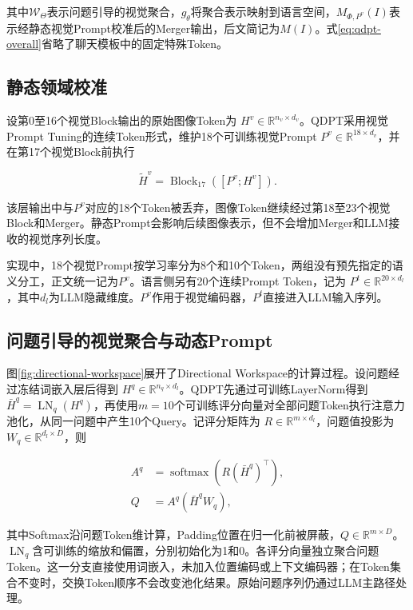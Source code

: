 其中$\mathcal{W}_{\Theta}$表示问题引导的视觉聚合，$g_{\theta}$将聚合表示映射到语言空间，$M_{\Phi,P^{v}}(I)$表示经静态视觉Prompt校准后的Merger输出，后文简记为$M(I)$。式\ref{eq:qdpt-overall}省略了聊天模板中的固定特殊Token。



\subsection{静态领域校准}

设第0至16个视觉Block输出的原始图像Token为
$H^{v}\in\mathbb{R}^{n_v\times d_v}$。QDPT采用视觉Prompt Tuning的连续Token形式\cite{jia2022visual}，维护18个可训练视觉Prompt
$P^{v}\in\mathbb{R}^{18\times d_v}$，并在第17个视觉Block前执行

\begin{equation}
\widetilde{H}^{v}
=\operatorname{Block}_{17}\!\left([P^{v};H^{v}]\right).
\end{equation}

该层输出中与$P^{v}$对应的18个Token被丢弃，图像Token继续经过第18至23个视觉Block和Merger。静态Prompt会影响后续图像表示，但不会增加Merger和LLM接收的视觉序列长度。

实现中，18个视觉Prompt按学习率分为8个和10个Token，两组没有预先指定的语义分工，正文统一记为$P^{v}$。语言侧另有20个连续Prompt Token\cite{lester2021power}，记为
$P^{t}\in\mathbb{R}^{20\times d_l}$，其中$d_l$为LLM隐藏维度。$P^{v}$作用于视觉编码器，$P^{t}$直接进入LLM输入序列。

\subsection{问题引导的视觉聚合与动态Prompt}

图\ref{fig:directional-workspace}展开了Directional Workspace的计算过程。设问题经过冻结词嵌入层后得到
$H^{q}\in\mathbb{R}^{n_q\times d_l}$。QDPT先通过可训练LayerNorm得到$\bar H^q=\operatorname{LN}_q(H^q)$，再使用$m=10$个可训练评分向量对全部问题Token执行注意力池化，从同一问题中产生10个Query。记评分矩阵为
$R\in\mathbb{R}^{m\times d_l}$，问题值投影为
$W_q\in\mathbb{R}^{d_l\times D}$，则

\begin{align}
A^{q} &= \operatorname{softmax}\!\left(R(\bar H^{q})^{\top}\right), \\
Q &= A^{q}(\bar H^{q}W_q),
\end{align}

其中Softmax沿问题Token维计算，Padding位置在归一化前被屏蔽，$Q\in\mathbb{R}^{m\times D}$。$\operatorname{LN}_q$含可训练的缩放和偏置，分别初始化为1和0。各评分向量独立聚合问题Token。这一分支直接使用词嵌入，未加入位置编码或上下文编码器；在Token集合不变时，交换Token顺序不会改变池化结果。原始问题序列仍通过LLM主路径处理。

